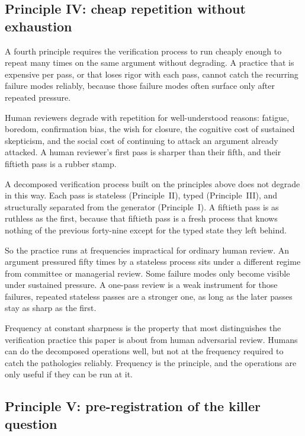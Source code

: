 \documentclass[
  11pt,
]{article}
\begin{document}
\subsection{Principle IV: cheap repetition without
exhaustion}\label{principle-iv-cheap-repetition-without-exhaustion}

A fourth principle requires the verification process to run cheaply enough
to repeat many times on the same argument without degrading. A practice
that is expensive per pass, or that loses rigor with each pass, cannot
catch the recurring failure modes reliably, because those failure modes
often surface only after repeated pressure.

Human reviewers degrade with repetition for well-understood reasons:
fatigue, boredom, confirmation bias, the wish for closure, the cognitive
cost of sustained skepticism, and the social cost of continuing to attack
an argument already attacked. A human reviewer's first pass is sharper
than their fifth, and their fiftieth pass is a rubber stamp.

A decomposed verification process built on the principles above does not
degrade in this way. Each pass is stateless (Principle~II), typed
(Principle~III), and structurally separated from the generator
(Principle~I). A fiftieth pass is as ruthless as the first, because that
fiftieth pass is a fresh process that knows nothing of the previous
forty-nine except for the typed state they left behind.

So the practice runs at frequencies impractical for ordinary human
review. An argument pressured fifty times by a stateless process sits
under a different regime from committee or managerial review. Some failure
modes only become visible under sustained pressure. A one-pass review is a
weak instrument for those failures, repeated stateless passes are a
stronger one, as long as the later passes stay as sharp as the first.

Frequency at constant sharpness is the property that most distinguishes
the verification practice this paper is about from human adversarial
review. Humans can do the decomposed operations well, but not at the
frequency required to catch the pathologies reliably. Frequency is the
principle, and the operations are only useful if they can be run at it.

\subsection{Principle V: pre-registration of the killer
question}\label{principle-v-pre-registration-of-the-killer-question}
\end{document}
